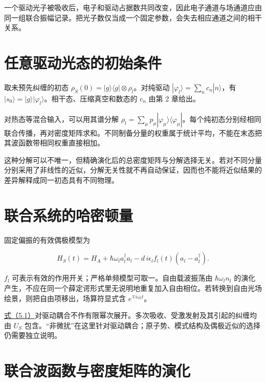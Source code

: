 \documentclass[UTF8,a4paper,zihao=-4,openany,fontset=fandol]{ctexbook}
\begin{document}
一个驱动光子被吸收后，电子和驱动占据数共同改变，因此电子通道与场通道应由同一组联合振幅记录。把光子数仅当成一个固定参数，会失去相应通道之间的相干关系。



\section{任意驱动光态的初始条件}\label{sec:05:2}


取未预先纠缠的初态 $\rho_S(0)=|g\rangle\langle g|\otimes\rho_l$。对纯驱动 $|\varphi_l\rangle=\sum_nc_n|n\rangle$，有 $|s_0\rangle=|g\rangle|\varphi_l\rangle$。相干态、压缩真空和数态的 $c_n$ 由第 2 章给出。



对热态等混合输入，可以用其谱分解 $\rho_l=\sum_\mu p_\mu|\varphi_\mu\rangle\langle\varphi_\mu|$。每个纯初态分别经相同联合传播，再对密度矩阵求和。不同制备分量的权重属于统计平均，不能在末态把其波函数带相同权重直接相加。



这种分解可以不唯一，但精确演化后的总密度矩阵与分解选择无关。若对不同分量分别采用了非线性的近似，分解无关性就不再自动保证，因而也不能将近似结果的差异解释成同一初态具有不同物理。



\section{联合系统的哈密顿量}\label{sec:05:3}


固定偏振的有效偶极模型为



\begin{equation*}
H_S(t)=H_A+\hbar\omega_la_l^\dagger a_l
-d\,i\epsilon_l f_l(t)(a_l-a_l^\dagger).
\tag{5.1}\label{eq:5.1}
\end{equation*}


$f_l$ 可表示有效的作用开关；严格单频模型可取一。自由载波振荡由 $\hbar\omega_l n_l$ 的演化产生，不应在同一个薛定谔形式里无说明地重复加入自由相位。若转换到自由光场绘景，则把自由项移出，场算符显式含 $e^{\mp i\omega_lt}$。



\hyperref[eq:5.1]{式（5.1）}对驱动耦合不作有限幂次展开。多次吸收、受激发射及其引起的纠缠均由 $U_S$ 包含。“非微扰”在这里针对驱动耦合；原子势、模式结构及偶极近似的选择仍需要独立说明。



\section{联合波函数与密度矩阵的演化}\label{sec:05:4}
\end{document}
